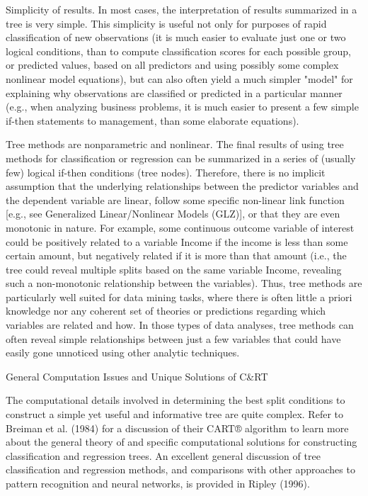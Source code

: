 Simplicity of results. In most cases, the interpretation of results summarized in a tree is very simple. This simplicity is useful not only for purposes of rapid classification of new observations (it is much easier to evaluate just one or two logical conditions, than to compute classification scores for each possible group, or predicted values, based on all predictors and using possibly some complex nonlinear model equations), but can also often yield a much simpler "model" for explaining why observations are classified or predicted in a particular manner (e.g., when analyzing business problems, it is much easier to present a few simple if-then statements to management, than some elaborate equations).

Tree methods are nonparametric and nonlinear. The final results of using tree methods for classification or regression can be summarized in a series of (usually few) logical if-then conditions (tree nodes). Therefore, there is no implicit assumption that the underlying relationships between the predictor variables and the dependent variable are linear, follow some specific non-linear link function [e.g., see Generalized Linear/Nonlinear Models (GLZ)], or that they are even monotonic in nature. For example, some continuous outcome variable of interest could be positively related to a variable Income if the income is less than some certain amount, but negatively related if it is more than that amount (i.e., the tree could reveal multiple splits based on the same variable Income, revealing such a non-monotonic relationship between the variables). Thus, tree methods are particularly well suited for data mining tasks, where there is often little a priori knowledge nor any coherent set of theories or predictions regarding which variables are related and how. In those types of data analyses, tree methods can often reveal simple relationships between just a few variables that could have easily gone unnoticed using other analytic techniques.

General Computation Issues and Unique Solutions of C&RT

The computational details involved in determining the best split conditions to construct a simple yet useful and informative tree are quite complex. Refer to Breiman et al. (1984) for a discussion of their CART® algorithm to learn more about the general theory of and specific computational solutions for constructing classification and regression trees. An excellent general discussion of tree classification and regression methods, and comparisons with other approaches to pattern recognition and neural networks, is provided in Ripley (1996).

